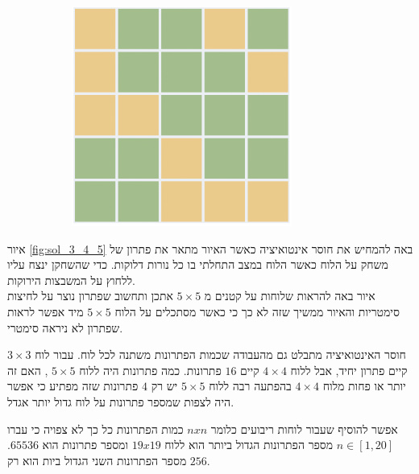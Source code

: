 \documentclass[12pt,twoside]{article}
\begin{document}
\begin{figure}[ht]
\begin{subfigure}[b]{.25\linewidth}
    \end{subfigure}
    \begin{subfigure}[b]{.25\linewidth}
    \includegraphics[width=\linewidth]{images/5x5_sol.PNG}
    \end{subfigure}

\end{figure}
\sethebrew

איור
\ref{fig:sol_3_4_5}
באה להמחיש את חוסר  אינטואיציה
כאשר האיור מתאר את פתרון של משחק על הלוח כאשר הלוח במצב התחלתי בו כל נורות דלוקות.
כדי שהשחקן ינצח עליו ללחוץ על המשבצות הירוקות.
\\
איור באה להראות שלוחות על קטנים מ
$5 \times 5$
אתכן ותחשוב שפתרון נוצר על לחיצות סימטריות והאיור ממשיך שזה לא כך 
כי כאשר מסתכלים על הלוח 
$5 \times 5$
מיד אפשר לראות שפתרון לא ניראה סימטרי.

חוסר האינטואיציה מתבלט גם מהעבודה שכמות הפתרונות משתנה לכל לוח.
עבור לוח 
$3 \times 3$
קיים פתרון יחיד,
אבל ללוח 
$4 \times 4$
קיים
$16$
פתרונות.
כמה פתרונות היה ללוח
$5 \times 5$
,
האם זה יותר או פחות מלוח
$4 \times 4$
בהפתעה רבה ללוח 
$5 \times 5$
יש רק 
$4$
פתרונות שזה  מפתיע כי אפשר היה לצפות שמספר פתרונות על לוח גדול יותר אגדל.

אפשר להוסיף שעבור לוחות ריבועים כלומר
$n x n$
כמות הפתרונות כל כך לא צפויה כי עברו 
$n \in [1,20]$
מספר הפתרונות הגדול ביותר הוא ללוח
$19x19$
ומספר פתרונות 
הוא 
$65536$.
מספר הפתרונות השני הגדול ביות הוא רק
$256$.
\end{document}
